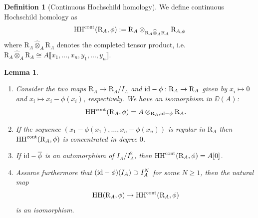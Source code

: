 \documentclass[a4paper, 10pt, oneside, reqno]{amsart}
\theoremstyle{plain}
\newtheorem{lem}[thm]{Lemma}
\theoremstyle{definition}
\newtheorem{defi}[thm]{Definition}
\theoremstyle{remark}
\newcommand{\RR}{\mathrm{R}}
\newcommand{\HHH}{\mathrm{HH}}
\begin{document}
\begin{defi}[Continuous Hochschild homology]
We define continuous Hochschild homology as 
$$\HHH^{\cont}(\RR_A, \phi) := \RR_{A} \otimes_{\RR_A \widehat{\otimes}_A \RR_A} \RR_{A, \phi}$$
where $\RR_A \widehat{\otimes}_A \RR_A$ denotes the completed tensor product, i.e. $\RR_A \widehat{\otimes}_A \RR_A \cong A\llbracket x_1,\dots, x_n, y_1, \dots, y_n\rrbracket$. 
\end{defi}

\begin{lem}\label{lem:reduction-koszul-calculation}
\begin{enumerate}
\item Consider the two maps $\RR_A \to \RR_A/I_A$ and $\id - \phi : \RR_A \to \RR_A$ given by $x_i \mapsto 0$ and $x_i \mapsto x_i - \phi(x_i)$, respectively. We have an isomorphism in $\DD(A)$: 
$$\HHH^{\cont}(\RR_A, \phi) = A \otimes_{\RR_A, \id - \phi} \RR_A.$$
\item If the sequence $(x_1 - \phi(x_1), \dots, x_n - \phi(x_n))$ is regular in $\RR_A$ then $\HHH^{\cont}(\RR_A, \phi)$ is concentrated in degree $0$.
\item If $\mathrm{id} - \overline{\phi}$ is an automorphism of $I_A/I_A^2$, then $\HHH^{\cont}(\RR_A, \phi) = A[0]$.
\item Assume furthermore that $(\mathrm{id} - \phi)(I_A) \supset I_A^N$ for some $N \geq 1$, then the natural map 
$$\HHH(\RR_A, \phi) \to \HHH^{\cont}(\RR_A, \phi)$$
is an isomorphism. 
\end{enumerate}
\end{lem}
\end{document}
